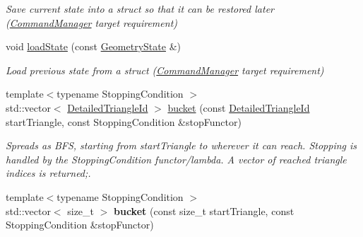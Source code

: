 \begin{DoxyCompactItemize}
\begin{DoxyCompactList}\small\item\em Save current state into a struct so that it can be restored later (\mbox{\hyperlink{classpepr3d_1_1_command_manager}{Command\+Manager}} target requirement) \end{DoxyCompactList}\item 
\mbox{\label{classpepr3d_1_1_geometry_aebe9b03fabcd1d3fca4108eaf34c6e70}} 
void \mbox{\hyperlink{classpepr3d_1_1_geometry_aebe9b03fabcd1d3fca4108eaf34c6e70}{load\+State}} (const \mbox{\hyperlink{structpepr3d_1_1_geometry_1_1_geometry_state}{Geometry\+State}} \&)
\begin{DoxyCompactList}\small\item\em Load previous state from a struct (\mbox{\hyperlink{classpepr3d_1_1_command_manager}{Command\+Manager}} target requirement) \end{DoxyCompactList}\item 
\mbox{\label{classpepr3d_1_1_geometry_a4a49d4588081ba91381fbd86e3837e75}} 
{\footnotesize template$<$typename Stopping\+Condition $>$ }\\std\+::vector$<$ \mbox{\hyperlink{structpepr3d_1_1_detailed_triangle_id}{Detailed\+Triangle\+Id}} $>$ \mbox{\hyperlink{classpepr3d_1_1_geometry_a4a49d4588081ba91381fbd86e3837e75}{bucket}} (const \mbox{\hyperlink{structpepr3d_1_1_detailed_triangle_id}{Detailed\+Triangle\+Id}} start\+Triangle, const Stopping\+Condition \&stop\+Functor)
\begin{DoxyCompactList}\small\item\em Spreads as B\+FS, starting from start\+Triangle to wherever it can reach. Stopping is handled by the Stopping\+Condition functor/lambda. A vector of reached triangle indices is returned;. \end{DoxyCompactList}\item 
\mbox{\label{classpepr3d_1_1_geometry_a7a6b768a13d349b8e5a88e1210e034fb}} 
{\footnotesize template$<$typename Stopping\+Condition $>$ }\\std\+::vector$<$ size\+\_\+t $>$ {\bfseries bucket} (const size\+\_\+t start\+Triangle, const Stopping\+Condition \&stop\+Functor)
\item 
\mbox{\label{classpepr3d_1_1_geometry_a982d86bb64738f64e4de60017e1a4ee3}} 

\end{DoxyCompactItemize}
